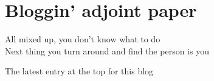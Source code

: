 


\chapter{Bloggin' adjoint paper}
\label{chap:blogAdjoint}

\begin{bartlett}
All mixed up, you don't know what to do \\
Next thing you turn around and find the person is you
\end{bartlett}
%
%
%


\noindent
{\color{red} The latest entry at the top for this blog}
\bigskip\bigskip

